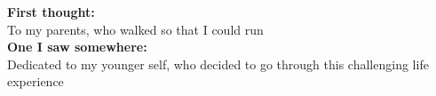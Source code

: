 {\bf First thought:}\\
To my parents, who walked so that I could run \\
{\bf One I saw somewhere:}\\
Dedicated to my younger self, who decided to go through this challenging life experience